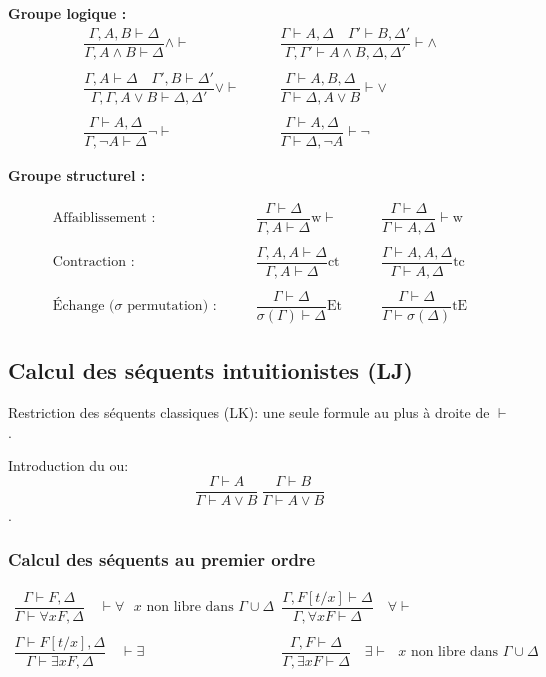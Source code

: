 \documentclass[french]{article}
\begin{document}
\textbf{Groupe logique :}
\begin{align*}
\dfrac{\Gamma,A,B \vdash \Delta}{\Gamma, A \land B \vdash \Delta} \land \vdash &\qquad 
\dfrac{\Gamma \vdash A,\Delta \quad \Gamma' \vdash B,\Delta'}{\Gamma,\Gamma' \vdash A \land B, \Delta, \Delta'} \vdash \land \\ 
\\
\dfrac{\Gamma, A \vdash\Delta \quad \Gamma', B \vdash \Delta'}{\Gamma,\Gamma,  A \lor B \vdash \Delta, \Delta'} \lor \vdash    &\qquad 
\dfrac{\Gamma \vdash A, B, \Delta}{\Gamma \vdash \Delta, A \lor B} \vdash \lor\\
\\
\dfrac{\Gamma \vdash A, \Delta}{\Gamma, \neg A \vdash \Delta} \neg \vdash  &\qquad 
\dfrac{\Gamma \vdash A,\Delta}{\Gamma \vdash \Delta, \neg A} \vdash \neg
\end{align*}

\textbf{Groupe structurel :}

\begin{align*}
\text{Affaiblissement :} &\qquad \dfrac{\Gamma\vdash\Delta}{\Gamma, A\vdash\Delta}\text{w}\vdash &\qquad
\dfrac{\Gamma\vdash\Delta}{\Gamma\vdash A,\Delta}\vdash\text{w}\\
\\
\text{Contraction :} &\qquad\dfrac{\Gamma, A, A\vdash\Delta}{\Gamma, A\vdash\Delta}\text{ct} &\qquad
\dfrac{\Gamma\vdash A, A,\Delta}{\Gamma\vdash A,\Delta}\text{tc}\\
\\
\text{Échange ($\sigma$ permutation) :}&\qquad\dfrac{\Gamma\vdash\Delta}{\sigma (\Gamma)\vdash\Delta}\text{Et} &\qquad
\dfrac{\Gamma\vdash\Delta}{\Gamma\vdash\sigma (\Delta)}\text{tE}
\end{align*}


\subsection{Calcul des séquents intuitionistes (LJ)}
Restriction des séquents classiques (LK): une seule formule au plus à droite de $\vdash$.

Introduction du ou:
\[\dfrac{\Gamma\vdash A}{\Gamma\vdash A\vee B}\ \frac{\Gamma\vdash B}{\Gamma\vdash A\vee B}\].


\subsubsection{Calcul des séquents au premier ordre}

\begin{align*}
\dfrac{\Gamma\vdash F,\Delta}{\Gamma\vdash\forall x F,\Delta} \quad \vdash\forall \text{ $x$ non libre dans $\Gamma\cup\Delta$} &\qquad \dfrac{\Gamma, F[t/x]\vdash\Delta}{\Gamma, \forall x F\vdash\Delta} \quad \forall\vdash
\\
\\
\dfrac{\Gamma\vdash F[t/x],\Delta}{\Gamma\vdash\exists x F,\Delta} \quad \vdash\exists &\qquad
\dfrac{\Gamma, F\vdash\Delta}{\Gamma, \exists x F\vdash\Delta} \quad \exists\vdash \text{ $x$ non libre dans  $\Gamma\cup\Delta$}
\end{align*}
\end{document}
